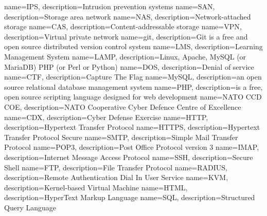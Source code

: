 {
  name=IPS,
  description={Intrusion prevention systems}
}
{
  name=SAN,
  description={Storage area network}
}
{
  name=NAS,
  description={Network-attached storage}
}
{
  name=CAS,
  description={Content-addressable storage}
}
{
  name=VPN,
  description={Virtual private network}
}
{
  name=git,
  description={Git is a free and open source distributed version control system}
}
{
  name=LMS,
  description={Learning Management System}
}
{
  name=LAMP,
  description={Linux, Apache, MySQL (or MariaDB) PHP (or Perl or Python)}
}
{
  name=DOS,
  description={Denial of service}
}
{
  name=CTF,
  description={Capture The Flag}
}
{
  name=MySQL,
  description={an open source relational database management system}
}
{
  name=PHP,
  description={is a free, open source scripting language designed for web development}
}
{
  name=NATO CCD COE,
  description={NATO Cooperative Cyber Defence Centre of Excellence}
}
{
  name=CDX,
  description={Cyber Defense Exercise}
}
{
  name=HTTP,
  description={Hypertext Transfer Protocol}
}
{
  name=HTTPS,
  description={Hypertext Transfer Protocol Secure}
}
{
  name=SMTP,
  description={Simple Mail Transfer Protocol}
}
{
  name=POP3,
  description={Post Office Protocol version 3}
}
{
  name=IMAP,
  description={Internet Message Access Protocol}
}
{
  name=SSH,
  description={Secure Shell}
}
{
  name=FTP,
  description={File Transfer Protocol}
}
{
  name=RADIUS,
  description={Remote Authentication Dial In User Service}
}
{
  name=KVM,
  description={Kernel-based Virtual Machine}
}
{
  name=HTML,
  description={HyperText Markup Language}
}
{
  name=SQL,
  description={Structured Query Language}
}